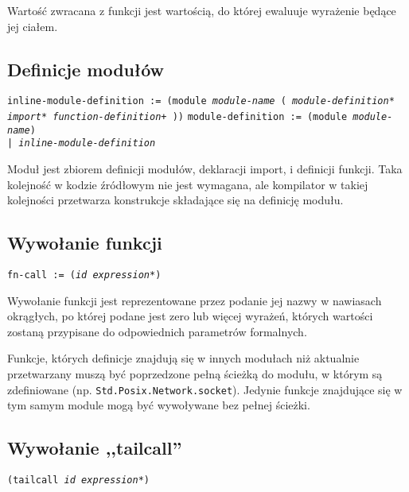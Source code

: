 Wartość zwracana z funkcji jest wartością, do której ewaluuje wyrażenie będące jej ciałem.

\subsection{Definicje modułów}

\texttt{inline-module-definition := (module \emph{module-name} (
\newline
\phantom{inline-module-definition := ~ }\emph{module-definition}*
\newline
\phantom{inline-module-definition := ~ }\emph{import}*
\newline
\phantom{inline-module-definition := ~ }\emph{function-definition}+
))}
\newline
\texttt{module-definition := (module \emph{module-name}) \\
\phantom{module-definition :}| \emph{inline-module-definition}}
\newline

Moduł jest zbiorem definicji modułów, deklaracji import, i definicji funkcji.
Taka kolejność w kodzie źródłowym nie jest wymagana, ale kompilator w takiej kolejności przetwarza konstrukcje
składające się na definicję modułu.

\subsection{Wywołanie funkcji}
\label{viuact_spec_fn_call}

\texttt{fn-call := (\emph{id} \emph{expression}*)}
\newline

Wywołanie funkcji jest reprezentowane przez podanie jej nazwy w nawiasach okrągłych, po której podane jest
zero lub więcej wyrażeń, których wartości zostaną przypisane do odpowiednich parametrów formalnych.

Funkcje, których definicje znajdują się w innych modułach niż aktualnie przetwarzany muszą być poprzedzone
pełną ścieżką do modułu, w którym są zdefiniowane (np. \texttt{Std.Posix.Network.socket}). Jedynie funkcje
znajdujące się w tym samym module mogą być wywoływane bez pełnej ścieżki.

\subsection{Wywołanie ,,tailcall''}
\label{viuact_spec_tail_call}

\texttt{(tailcall \emph{id} \emph{expression}*)}
\newline

